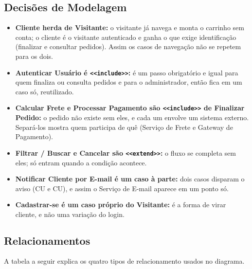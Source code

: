 \documentclass[12pt,a4paper]{article}
\begin{document}
\subsection{Decisões de Modelagem}

\begin{itemize}
\setlength{\itemsep}{0.4em}
\item \textbf{Cliente herda de Visitante:} o visitante já navega e monta o carrinho sem conta; o cliente é o visitante autenticado e ganha o que exige identificação (finalizar e consultar pedidos). Assim os casos de navegação não se repetem para os dois.
\item \textbf{Autenticar Usuário é \texttt{<<include>>}:} é um passo obrigatório e igual para quem finaliza ou consulta pedidos e para o administrador, então fica em um caso só, reutilizado.
\item \textbf{Calcular Frete e Processar Pagamento são \texttt{<<include>>} de Finalizar Pedido:} o pedido não existe sem eles, e cada um envolve um sistema externo. Separá-los mostra quem participa de quê (Serviço de Frete e Gateway de Pagamento).
\item \textbf{Filtrar / Buscar e Cancelar são \texttt{<<extend>>}:} o fluxo se completa sem eles; só entram quando a condição acontece.
\item \textbf{Notificar Cliente por E-mail é um caso à parte:} dois casos disparam o aviso (CU e CU), e assim o Serviço de E-mail aparece em um ponto só.
\item \textbf{Cadastrar-se é um caso próprio do Visitante:} é a forma de virar cliente, e não uma variação do login.
\end{itemize}

\subsection{Relacionamentos}

A tabela a seguir explica os quatro tipos de relacionamento usados no diagrama.
\end{document}
